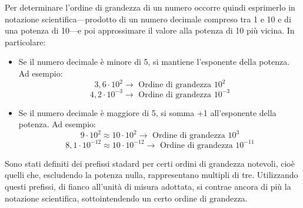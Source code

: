 Per determinare l'ordine di grandezza di un numero occorre quindi esprimerlo in
notazione scientifica—prodotto di un numero decimale compreso tra 1 e 10 e di
una potenza di 10—e poi approssimare il valore alla potenza di 10 più vicina.
In particolare:
\begin{itemize}
    \item Se il numero decimale è minore di 5, si mantiene l'esponente della
    potenza. Ad esempio:
    \[ 3,6 \cdot 10^2 \to \text{ Ordine di grandezza } 10^2 \]
    \[ 4,2 \cdot 10^{-3} \to \text{ Ordine di grandezza } 10^{-3} \]

    \item Se il numero decimale è maggiore di 5, si somma +1 all'esponente della
    potenza. Ad esempio:
    \[ 9 \cdot 10^2 \approx 10 \cdot 10^2 \to \text{ Ordine di grandezza } 10^3 \]
    \[ 8,1 \cdot 10^{-12} \approx 10 \cdot 10^{-12} \to \text{ Ordine di grandezza } 10^{-11} \]
\end{itemize}


Sono stati definiti dei prefissi stadard per certi ordini di grandezza notevoli,
cioè quelli che, escludendo la potenza nulla, rappresentano multipli di tre.
Utilizzando questi prefissi, di fianco all'unità di misura adottata, si contrae
ancora di più la notazione scientifica, sottointendendo un certo ordine di
grandezza.

